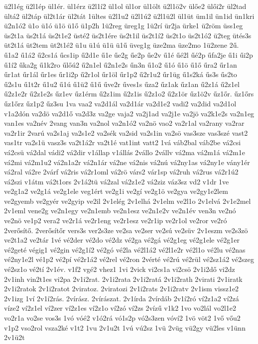 {ü2l1ég
ü2l1ép
ül1ér.
ül1érz
ü2l1í2
ül1ol
ül1or
ül1ölt
ü2l1ö2v
ülőe2
ülői2r
ül2tad
ültá2
ül2táp
ül2t1ár
ül2tát
1ültes
ü2l1u2
ü2l1ú2
ü2l1ü2l
ül1üt
üm1il
ün1id
ün1kri
ü2n1ó2
ü1o
ü1ó
ü1ö
ü1ő
ü1p2h
1ü2reg
üreg1g
1ü2rí
ür2ja
ürke1
ü2röm
üss1eg
üs2t1a
üs2t1á
üs2t1e2
üsté2
üs2t1ére
üs2t1il
üs2t1í2
üs2t1o
üs2t1ó2
ü2teg
ütés3s
üt2t1á
üt2tem
üt2t1é2
ü1u
ü1ú
ü1ü
ü1ű
üveg1g
üze2ma
üze2mo
1ü2zene
2ű.
ű1a2
ű1á2
ű2cs1á
űcs1ip
ű2d1e
ű1e
űe2g
űe2p
űe2v
ű1é
űé2l
űé2p
űfa2je
ű1i
űi2p
ű1í2
űka2g
ű1k2ro
űlőú2
ű2n1el
ű2n1e2s
űn3n
ű1o2
ű1ó
ű1ö
ű1ő
űra2
űr1an
űr1at
űr1ál
űr1es
űr1i2p
ű2r1ol
űr1öl
űr1p2
ű2r1u2
űr1üg
ű1s2ká
űs3s
űs2to
ű2s1u
ű1t2r
ű1u2
ű1ú
ű1ü2
ű1ű
űve2r
űves1s
űza2
űz1ak
űz1an
ű2z1á
ű2z1el
ű2z1e2r
ű2z1e2s
űz1ev
űz1érm
ű2z1im
ű2z1is
ű2z1o2
ű2z1ör
űz1ö2v
űz1őr.
űz1őrs
űz1őrz
űz1p2
űz3su
1va
vaa2
va2d1ál
va2d1ár
va2d1e2
vadi2
va2did
va2d1ol
v1a2dón
va2dö
va2d1ő
va2d3z
va2ge
vaja2
va2j1ad
va2j1e
va2jö
va2k1e2s
va2n1eg
van1es
va2név
2vang
van3n
va2nol
va2n1ó2
va2nö
vao2
va2r1al
va2rany
va2rar
va2r1ir
2varú
va2s1aj
va2s1e2
va2sék
va2sid
va2s1in
va2sö
vas3sze
vas3szé
vast2
vas1tr
va2s1ü
vasz3s
va2t1á2r
va2t1é
vat1int
vatt2
1vá
váb2bal
váb2be
vá2csi
vá2csü
vá2dal
vádi2
vá2dir
v1állap
v1állás
2vállo
2vállv
vá2ma
vá2m1á
vá2m1e
vá2mi
vá2m1u2
vá2n1a2r
vá2n1ár
vá2ne
vá2nis
vá2nú
vá2ny1as
vá2ny1e
vány1ér
vá2ral
vá2re
2várf
vá2ris
vá2r1oml
vá2rö
várs2
vár1sp
vá2ruh
vá2rus
vá2r1ú2
vá2szi
v1átm
vá2t1ors
2v1á2tü
vá2zal
vá2z1e2
vá2ziz
váz3sz
vd2
v1dr
1ve
ve2g1a2
ve2g1á
ve2g1ele
veg1ért
ve2g1i
ve2gí
ve2g1ö
ve2gya
ve2gy1e2lem
ve2gyemb
ve2gyér
ve2gyip
ve2il
2v1elég
2v1elhá
2v1elm
ve2l1o
2v1elvá
2v1e2mel
2v1eml
vene2g
ve2n1egy
ve2n1emb
ve2n1esz
ve2n1e2v
ve2n1év
ven3n
ve2nó
ve2nö
ve1p2
vera2
ve2r1á
ve2r1eng
ve2r1esz
ve2r1ip
ve2r1ol
ve2ror
ve2ró
2verősítő.
2verősítőr
vers3s
ver2s3ze
ve2sa
ve2ser
ve2sú
ve2süv
2v1eszm
ve2s3zö
ve2t1a2
ve2tár
1vé
vé2der
vé2do
vé2dz
vé2ga
vé2gá
vé2g1eg
vé2g1ele
vé2g1er
vé2geté
végig1
vé2gin
vé2g1í2
vé2gó
vé2la
vé2l1á2
vé2l1e2r
vé2l1o
vé2lu
vé2nas
vé2ny1e2l
vé1p2
vé2pí
vé2r1á2
vé2rel
vé2ron
2vérté
vé2rú
vé2rül
vé2sz1á2
vé2szeg
vé2sz1o
vé2tí
2v1év.
v1f2
vgé2
vhez1
1vi
2vick
vi2cs1a
vi2csö
2v1i2dő
vi2dz
2v1inh
vin2t1es
vi2pa
2v1i2rat.
2v1i2rata
2v1i2ratá
2v1i2rath
2virati
2v1iratk
2v1i2ratok
2v1i2ratot
2viratoz.
2viratozi
2v1i2rats
2v1i2ratv
2v1ism
vissz1e2
2v1izg
1ví
2v1í2rás.
2vírász.
2vírászat.
2v1írda
2vírdáb
2v1í2ró
ví2z1a2
ví2zá
víze2
ví2z1el
ví2zer
ví2z1es
ví2z1o
ví2zó
ví2zs
2vízű
v1k2
1vo
vo2lál
vo2l1e2
vo2r1a
vo2se
vos3s
1vó
vóé2
v1ó2rá
vó1s2p
vó2s3zen
vóví2
1vö
vöt2
1vő
vőu2
v1p2
vso2rol
vsza2ké
v1t2
1vu
2v1u2t
1vú
vú2sz
1vü
2vüg
vü2gy
vü2les
v1ünn
2v1ü2t
}
